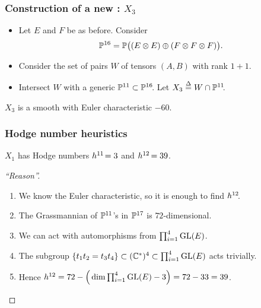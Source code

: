 \begin{frame}
    \frametitle{Construction of a new \CY: $X_3$}

    \begin{itemize}
    	\item
    	Let $E$ and $F$ be as before. Consider
        \[
            \P^{16} = \P\big((E \otimes E) \oplus (F \otimes F \otimes F)\big).
        \]
        
        \item
        Consider the set of pairs $W$ of tensors $(A, B)$ with rank $1 + 1$.

        \item
        Intersect $W$ with a generic $\P^{11} \subset \P^{16}\mkern-4mu$. Let $X_3 \defeq  W \cap \P^{11}\mkern-4mu$.
    \end{itemize}

    \begin{theorem}
        $X_3$ is a smooth \CY with Euler characteristic $-60$.
    \end{theorem}
\end{frame}


\begin{frame}
    \frametitle{Hodge number heuristics}

    \begin{conjecture}
        $X_1$ has Hodge numbers $h^{11}\mkern-3mu = 3$ and $h^{12}\mkern-2mu = 39$.
    \end{conjecture}

    \begin{proof}[``Reason'']
        \begin{enumerate}[<+->]
            \item
	        We know the Euler characteristic, so it is enough to find $h^{12}\mkern-4mu$.

            \item
            The Grassmannian of $\P^{11}$'s in $\P^{17}$ is $72$-dimensional.

            \item
            We can act with automorphisms from $\prod_{i = 1}^4 \GL(E)$.

            \item
            The subgroup $\{ t_1t_2 = t_3t_4 \} \subset (\C^\ast)^4 \subset \prod_{i = 1}^4 \GL(E)$ acts trivially.
            \vspace*{-0.5ex}

            \item
            Hence $h^{12} = 72 - \Big(\dim \prod_{i = 1}^4 \GL(E) - 3\Big) = 72-33 = 39$.
            \qedhere
        \end{enumerate}
    \end{proof}
\end{frame}